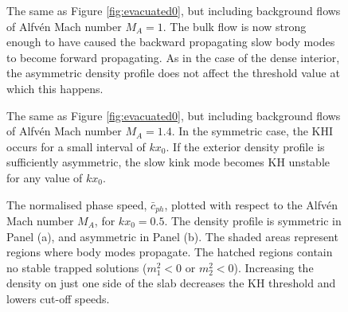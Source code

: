 \begin{figure}[t]
\centering
{}
\caption{The same as Figure \ref{fig:evacuated0}, but including background flows of Alfv\'en Mach number $M_A = 1$.
The bulk flow is now strong enough to have caused the backward propagating slow body modes to become forward propagating.
As in the case of the dense interior, the asymmetric density profile does not affect the threshold value at which this happens.}
\label{fig:evacuated2}
\end{figure}

\begin{figure}[t]
\centering
{}
\caption{The same as Figure \ref{fig:evacuated0}, but including background flows of Alfv\'en Mach number $M_A = 1.4$.
In the symmetric case, the KHI occurs for a small interval of $k x_0$.
If the exterior density profile is sufficiently asymmetric, the slow kink mode becomes KH unstable for any value of $k x_0$.}
\label{fig:evacuated3}
\end{figure}

\begin{figure}[!ht]
\centering
\end{figure}
\begin{figure}[!ht]%
\centering
{}
\caption{The normalised phase speed, $\bar c_{ph}$, plotted with respect to the Alfv\'en Mach number $M_A$, for $k x_0 = 0.5$.
The density profile is symmetric in Panel (a), and asymmetric in Panel (b).
The shaded areas represent regions where body modes propagate.
The hatched regions contain no stable trapped solutions ($m_1^2 < 0$ or $m_2^2 < 0$). Increasing the density on just one side of the slab decreases the KH threshold and lowers cut-off speeds.}
\label{fig:flow}
\end{figure}

